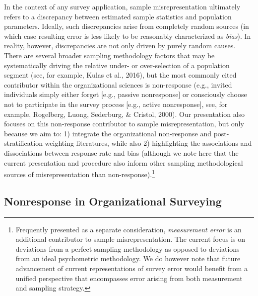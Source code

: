 \documentclass[
  ,man,floatsintext]{apa6}
\begin{document}
In the context of any survey application, sample misrepresentation ultimately refers to a discrepancy between estimated sample statistics and population parameters. Ideally, such discrepancies arise from completely random sources (in which case resulting error is less likely to be reasonably characterized as \emph{bias}). In reality, however, discrepancies are not only driven by purely random causes. There are several broader sampling methodology factors that may be systematically driving the relative under- or over-selection of a population segment (see, for example, Kulas et al., 2016), but the most commonly cited contributor within the organizational sciences is non-response (e.g., invited individuals simply either forget {[}e.g., passive nonresponse{]} or consciously choose not to participate in the survey process {[}e.g., active nonresponse{]}, see, for example, Rogelberg, Luong, Sederburg, \& Cristol, 2000). Our presentation also focuses on this non-response contributor to sample misrepresentation, but only because we aim to: 1) integrate the organizational non-response and post-stratification weighting literatures, while also 2) highlighting the associations and dissociations between response rate and bias (although we note here that the current presentation and procedure also inform other sampling methodological sources of misrepresentation than non-response).\footnote{Frequently presented as a separate consideration, \emph{measurement error} is an additional contributor to sample misrepresentation. The current focus is on deviations from a perfect sampling methodology as opposed to deviations from an ideal psychometric methodology. We do however note that future advancement of current representations of survey error would benefit from a unified perspective that encompasses error arising from both measurement and sampling strategy.}

\hypertarget{nonresponse-in-organizational-surveying}{%
\subsection{Nonresponse in Organizational Surveying}\label{nonresponse-in-organizational-surveying}}
\end{document}
